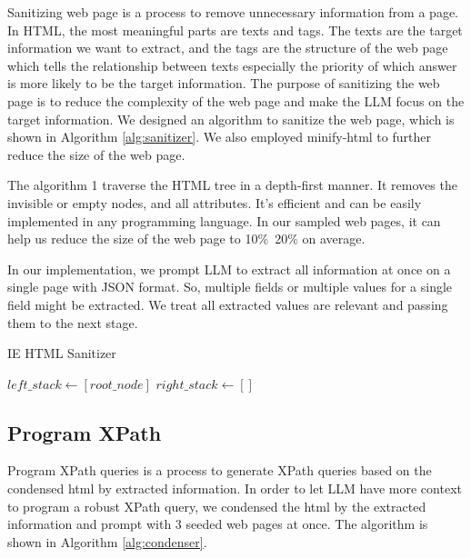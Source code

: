 \documentclass[a4paper]{article}
\begin{document}
Sanitizing web page is a process to remove unnecessary information from a page. In HTML, the most meaningful parts are texts and tags. The texts are the target information we want to extract, and the tags are the structure of the web page which tells the relationship between texts especially the priority of which answer is more likely to be the target information. The purpose of sanitizing the web page is to reduce the complexity of the web page and make the LLM focus on the target information. We designed an algorithm to sanitize the web page, which is shown in Algorithm \ref{alg:sanitizer}. We also employed minify-html\cite{minifyhtml} to further reduce the size of the web page.

The algorithm 1 traverse the HTML tree in a depth-first manner. It removes the invisible or empty nodes, and all attributes. It's efficient and can be easily implemented in any programming language. In our sampled web pages, it can help us reduce the size of the web page to 10\%~20\% on average.

In our implementation, we prompt LLM to extract all information at once on a single page with JSON format. So, multiple fields or multiple values for a single field might be extracted. We treat all extracted values are relevant and passing them to the next stage.


\begin{algorithm}
  \SetAlgoLined
  \caption{IE HTML Sanitizer}
  \label{alg:sanitizer}
  
  $left\_stack \gets [root\_node]$\;
  $right\_stack \gets []$\;
  
  
\end{algorithm}

\subsection{Program XPath}

Program XPath queries is a process to generate XPath queries based on the condensed html by extracted information. In order to let LLM have more context to program a robust XPath query, we condensed the html by the extracted information and prompt with 3 seeded web pages at once. The algorithm is shown in Algorithm \ref{alg:condenser}.
\end{document}
